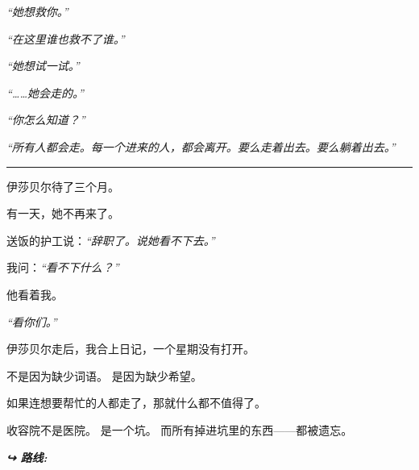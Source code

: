 \noindent \textit{“她想救你。”}

\noindent \textit{“在这里谁也救不了谁。”}

\noindent \textit{“她想试一试。”}

\noindent \textit{“……她会走的。”}

\noindent \textit{“你怎么知道？”}

\noindent \textit{“所有人都会走。每一个进来的人，都会离开。要么走着出去。要么躺着出去。”}

\vspace{0.5em}\noindent\rule{\textwidth}{0.5pt}\vspace{0.5em}

\noindent 伊莎贝尔待了三个月。

\noindent 有一天，她不再来了。

\noindent 送饭的护工说：\textit{“辞职了。说她看不下去。”}

\noindent 我问：\textit{“看不下什么？”}

\noindent 他看着我。

\noindent \textit{“看你们。”}

\noindent 伊莎贝尔走后，我合上日记，一个星期没有打开。

\noindent 不是因为缺少词语。
是因为缺少希望。

\noindent 如果连想要帮忙的人都走了，那就什么都不值得了。

\noindent 收容院不是医院。
是一个坑。
而所有掉进坑里的东西——都被遗忘。

\vspace{0.5em}
\noindent\textit{\textbf{↪ 路线:}  \rotasep {}}
